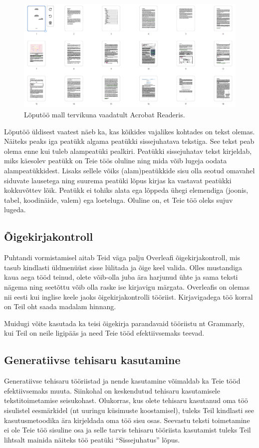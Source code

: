 \begin{figure}[t]
    \centering
    \includegraphics[width=\textwidth]{joonised/Joonis6-AcrobatReaderKuva.png}
    \caption{Lõputöö mall tervikuna vaadatult Acrobat Readeris.}
    \label{fig:acrobatReaderÜlevaade}
\end{figure}
Lõputöö üldisest vaatest näeb ka, kas kõikides vajalikes kohtades on tekst olemas. Näiteks peaks iga peatükk algama peatükki sissejuhatava tekstiga. See tekst peab olema enne kui tuleb alampeatüki pealkiri. Peatükki sissejuhatav tekst kirjeldab, miks käesolev peatükk on Teie töös oluline ning mida võib lugeja oodata alampeatükkidest. Lisaks sellele võiks (alam)peatükkide sisu olla seotud omavahel siduvate lausetega ning suurema peatüki lõpus kirjas ka vastavat peatükki kokkuvõttev lõik. Peatükk ei tohiks alata ega lõppeda ühegi elemendiga (joonis, tabel, koodinäide, valem) ega loeteluga. Oluline on, et Teie töö oleks sujuv lugeda.

\subsection{Õigekirjakontroll}
Puhtandi vormistamisel aitab Teid väga palju Overleafi õigekirjakontroll, mis tasub kindlasti üldmenüüst sisse lülitada ja õige keel valida. Olles mustandiga kaua aega tööd teinud, olete võib-olla juba ära harjunud ühte ja sama teksti nägema ning seetõttu võib olla raske ise kirjavigu märgata. Overleafis on olemas nii eesti kui inglise keele jaoks õigekirjakontrolli tööriist. Kirjavigadega töö korral on Teil oht saada madalam hinnang.

Muidugi võite kasutada ka teisi õigekirja parandavaid tööriistu nt Grammarly, kui Teil on neile ligipääs ja need Teie tööd efektiivsemaks teevad.

\subsection{Generatiivse tehisaru kasutamine}
Generatiivse tehisaru tööriistad ja nende kasutamine võimaldab ka Teie tööd efektiivsemaks muuta. Siinkohal on keskendutud tehisaru kasutamisele tekstitoimetamise seisukohast. Olukorras, kus olete tehisaru kasutanud oma töö sisulistel eesmärkidel (nt uuringu küsimuste koostamisel), tuleks Teil kindlasti see kasutusmetoodika ära kirjeldada oma töö sisu osas. Seevastu teksti toimetamine ei ole Teie töö sisuline osa ja selle tarvis tehisaru tööriista kasutamist tuleks Teil lihtsalt mainida näiteks töö peatüki “Sissejuhatus” lõpus.

